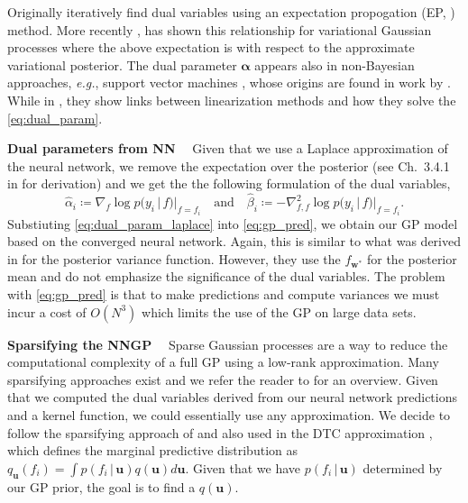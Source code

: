 \documentclass{article}
\makeatletter
\renewcommand{\paragraph}[1]{{\bf #1}~~}
\newcommand{\eg}{\textit{e.g.\@}\xspace}
\newcommand{\mathbold}[1]{\bm{#1}}
\newcommand{\mbf}[1]{\mathbf{#1}}
\renewcommand{\mid}{\,|\,}
\newcommand{\valpha}[0]{\mathbold{\alpha}}
\newcommand{\vu}{\mbf{u}}
\newcommand{\vw}{\mbf{w}}
\makeatother
\begin{document}
Originally \citet{csato2002sparse} iteratively find dual variables using an expectation propogation (EP, \cite{minka2001expectation}) method. More recently \cite{khan2017conjugate,adam2021dual}, has shown this relationship for variational Gaussian processes where the above expectation is with respect to the approximate variational posterior. The dual parameter $\valpha$ appears also in non-Bayesian approaches, \eg, support vector machines \citep{cortes1995support}, whose origins are found in work by \citet{kimeldorf1971some}. While in \citet{wilkinson2023bayes}, they show links between linearization methods and how they solve the \cref{eq:dual_param}.

\paragraph{Dual parameters from NN}
Given that we use a Laplace approximation of the neural network, we remove the expectation over the posterior (see Ch.~3.4.1 in \cite{rasmussen2006gaussian} for derivation) and we get the the following formulation of the dual variables,
%
\begin{equation}
  \label{eq:dual_param_laplace}
  \hat{\alpha}_i \coloneqq \nabla_{f}\log p(y_i \mid f) |_{f=f_i}
  \quad \text{and} \quad
  \hat{\beta}_i \coloneqq - \nabla^2_{f,f}\log p(y_i \mid f) |_{f=f_i}.
\end{equation}
%
Substiuting \cref{eq:dual_param_laplace} into \cref{eq:gp_pred}, we obtain our GP model based on the converged neural network. Again, this is similar to what was derived in \citet{immer2021improving} for the posterior variance function. However, they use the $f_{\vw^*}$ for the posterior mean and do not emphasize the significance of the dual variables. The problem with \cref{eq:gp_pred} is that to make predictions and compute variances we must incur a cost of $O(N^3)$ which limits the use of the GP on large data sets.

\paragraph{Sparsifying the NNGP}
\label{sec:sparse-dual-gp}
%
Sparse Gaussian processes are a way to reduce the computational complexity of a full GP using a low-rank approximation. Many sparsifying approaches exist and we refer the reader to \cite{quinonero2005unifying} for an overview. Given that we computed the dual variables derived from our neural network predictions and a kernel function, we could essentially use any approximation. We decide to follow the sparsifying approach of \citet{titsias2009variational} and also used in the DTC approximation \citep{quinonero2005unifying}, which defines the marginal predictive distribution as $q_{\vu}(f_i)  = \int p(f_i  \mid \vu) q(\vu)  d\vu$. Given that we have $p(f_i  \mid \vu)$ determined by our GP prior, the goal is to find a $q(\vu)$. 
\end{document}

